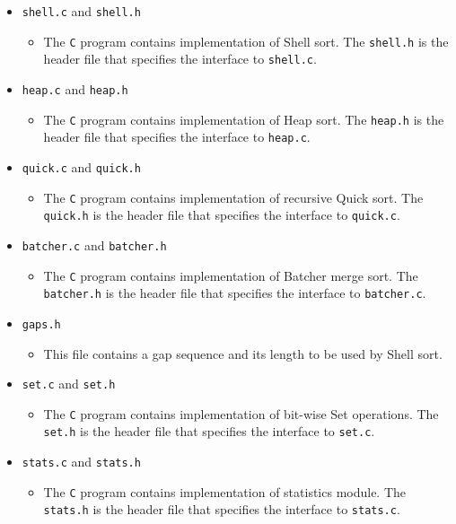 \documentclass[12pt]{article}
\begin{document}
\begin{itemize}
   \item \texttt{shell.c} and \texttt{shell.h}
   \begin{itemize}
     \item The \texttt{C} program contains implementation of Shell sort. The \texttt{shell.h} is the header file that specifies the interface to \texttt{shell.c}.
   \end{itemize}
   \item \texttt{heap.c} and \texttt{heap.h}
   \begin{itemize}
     \item The \texttt{C} program contains implementation of Heap sort. The \texttt{heap.h} is the header file that specifies the interface to \texttt{heap.c}.
   \end{itemize}
   \item \texttt{quick.c} and \texttt{quick.h}
   \begin{itemize}
     \item The \texttt{C} program contains implementation of recursive Quick sort. The \texttt{quick.h} is the header file that specifies the interface to \texttt{quick.c}.
   \end{itemize}
   \item \texttt{batcher.c} and \texttt{batcher.h}
   \begin{itemize}
     \item The \texttt{C} program contains implementation of Batcher merge sort. The \texttt{batcher.h} is the header file that specifies the interface to \texttt{batcher.c}.
   \end{itemize}
   \item \texttt{gaps.h}
   \begin{itemize}
     \item This file contains a gap sequence and its length to be used by Shell sort.
   \end{itemize}
   \item \texttt{set.c} and \texttt{set.h}
   \begin{itemize}
     \item The \texttt{C} program contains implementation of bit-wise Set operations. The \texttt{set.h} is the header file that specifies the interface to \texttt{set.c}.
   \end{itemize}
   \item \texttt{stats.c} and \texttt{stats.h}
   \begin{itemize}
     \item The \texttt{C} program contains implementation of statistics module. The \texttt{stats.h} is the header file that specifies the interface to \texttt{stats.c}.

\end{itemize}
\end{itemize}
\end{document}
